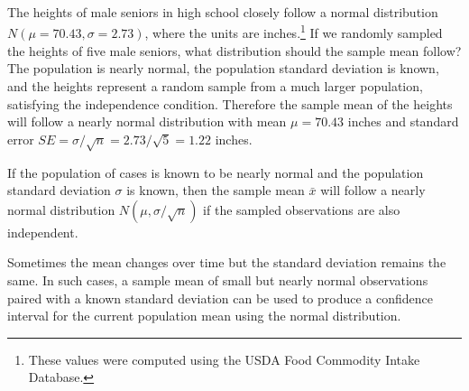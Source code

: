 \begin{example}{The heights of male seniors in high school closely follow a normal distribution $N(\mu=70.43, \sigma=2.73)$, where the units are inches.\footnote{These values were computed using the USDA Food Commodity Intake Database.} If we randomly sampled the heights of five male seniors, what distribution should the sample mean follow?}\label{simpleSampleOfFiveMaleSeniors}
The population is nearly normal, the population standard deviation is known, and the heights represent a random sample from a much larger population, satisfying the independence condition. Therefore the sample mean of the heights will follow a nearly normal distribution with mean $\mu=70.43$ inches and standard error $SE=\sigma/\sqrt{n} = 2.73/\sqrt{5}=1.22$ inches.
\end{example}

\begin{termBox}{
If the population of cases is known to be nearly normal and the population standard deviation $\sigma$ is known, then the sample mean $\bar{x}$ will follow a nearly normal distribution $N(\mu, \sigma/\sqrt{n})$ if the sampled observations are also independent.}
\end{termBox}

Sometimes the mean changes over time but the standard deviation remains the same. In such cases, a sample mean of small but nearly normal observations paired with a known standard deviation can be used to produce a confidence interval for the current population mean using the normal distribution.

